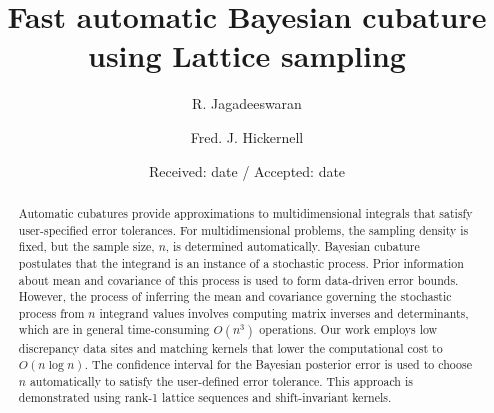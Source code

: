 \documentclass[twocolumn]{svjour3}          %
\begin{document}
\setlength\abovedisplayskip{1pt}
\setlength{\belowdisplayskip}{1pt}

\title{Fast automatic Bayesian cubature using Lattice sampling
}
%



\author{R. Jagadeeswaran         \and
        Fred. J. Hickernell %
}



\date{Received: date / Accepted: date}

\maketitle

\begin{abstract}
Automatic cubatures provide approximations to multidimensional integrals that satisfy user-specified error tolerances.  For multidimensional problems, the sampling density is fixed, but the
sample size, $n$, is determined automatically. Bayesian cubature postulates that the integrand is an instance of a stochastic process.
Prior information about mean and covariance of this process is used to form data-driven error bounds.  However, the process of inferring the mean and covariance governing the stochastic process from $n$ integrand values involves computing matrix inverses and determinants,
which are in general time-consuming $O(n^3)$ operations.
Our work employs low discrepancy data sites and matching kernels that lower the  computational cost to $O(n \log n)$.  The confidence interval for the Bayesian posterior error is used to choose $n$ automatically to satisfy the user-defined error tolerance.  This approach is demonstrated using rank-1 lattice sequences and shift-invariant kernels.


\end{abstract}
\end{document}
